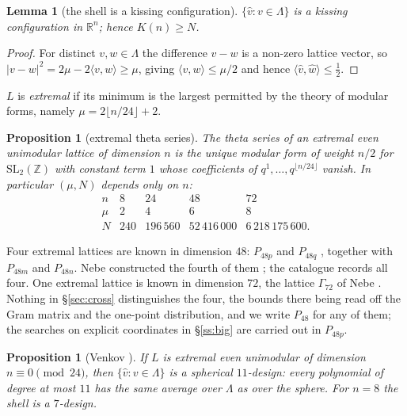 \documentclass[11pt]{amsart}
\newtheorem{lemma}[theorem]{Lemma}
\newtheorem{proposition}[theorem]{Proposition}
\theoremstyle{remark}
\newcommand{\Pff}{P_{48}}
\newcommand{\Gsz}{\Gamma_{72}}
\newcommand{\ip}[2]{\langle #1,#2\rangle}
\newcommand{\R}{\mathbb{R}}
\newcommand{\Z}{\mathbb{Z}}
\begin{document}
\begin{lemma}[the shell is a kissing configuration]\label{lem:shell}
$\{\hat v: v\in\Lambda\}$ is a kissing configuration in $\R^n$; hence
$K(n)\ge N$.
\end{lemma}

\begin{proof}
For distinct $v,w\in\Lambda$ the difference $v-w$ is a non-zero lattice vector,
so $|v-w|^2=2\mu-2\ip{v}{w}\ge\mu$, giving $\ip{v}{w}\le\mu/2$ and hence
$\ip{\hat v}{\hat w}\le\tfrac12$.
\end{proof}

$L$ is \emph{extremal} if its minimum is the largest permitted by the theory of
modular forms, namely $\mu=2\lfloor n/24\rfloor+2$.

\begin{proposition}[extremal theta series]\label{prop:theta}
The theta series of an extremal even unimodular lattice of dimension $n$ is the
unique modular form of weight $n/2$ for $\mathrm{SL}_2(\Z)$ with constant term
$1$ whose coefficients of $q^1,\dots,q^{\lfloor n/24\rfloor}$ vanish. In
particular $(\mu,N)$ depends only on $n$:
\[
\begin{array}{lcccc}
 n   & 8   & 24      & 48           & 72 \\
 \mu & 2   & 4       & 6            & 8 \\
 N   & 240 & 196\,560 & 52\,416\,000 & 6\,218\,175\,600.
\end{array}
\]
\end{proposition}

Four extremal lattices are known in dimension $48$: $P_{48p}$ and $P_{48q}$
\cite[Ch.~7]{conway-sloane1999}, together with $P_{48m}$ and $P_{48n}$. Nebe
constructed the fourth of them \cite{nebe2014}; the catalogue
\cite{nebe-sloane} records all four. One extremal lattice is known in dimension
$72$, the lattice $\Gsz$ of Nebe \cite{nebe2012}. Nothing in \S\ref{sec:cross}
distinguishes the four, the bounds there being read off the Gram matrix and the
one-point distribution, and we write $\Pff$ for any of them; the searches on
explicit coordinates in \S\ref{ss:big} are carried out in $P_{48p}$.

\begin{proposition}[Venkov \cite{venkov1984}]\label{prop:venkov}
If $L$ is extremal even unimodular of dimension $n\equiv 0\pmod{24}$, then
$\{\hat v: v\in\Lambda\}$ is a spherical $11$-design: every polynomial of
degree at most $11$ has the same average over $\Lambda$ as over the sphere.
For $n=8$ the shell is a $7$-design.
\end{proposition}
\end{document}

